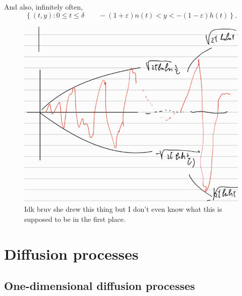 \documentclass[12pt]{report}
\begin{document}
And also, infinitely often,
\begin{equation*}
	\left\{(t,y):0\leq t\leq\delta\qquad-(1+\varepsilon)n(t)<y<-(1-\varepsilon)h(t)\right\}.
\end{equation*}
\begin{figure}[h]
	\centering
	\includegraphics[width=0.4\linewidth]{img/screenshot046}
	\caption{Idk bruv she drew this thing but I don't even know what this is supposed to be in the first place.}
	\label{fig:screenshot046}
\end{figure}
\chapter{Diffusion processes}
\section{One-dimensional diffusion processes}
\end{document}
